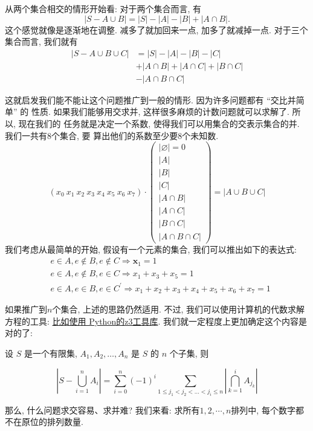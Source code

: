 从两个集合相交的情形开始看: 对于两个集合而言, 有
$$|S-A \cup B|=|S|-|A|-|B|+|A \cap B|. $$
这个感觉就像是逐渐地在调整. 减多了就加回来一点, 加多了就减掉一点. 
对于三个集合而言, 我们就有
$$
\begin{aligned}
|S-A \cup B \cup C| &=|S|-|A|-|B|-|C| \\
&+|A \cap B|+|A \cap C|+|B \cap C| \\
&-|A \cap B \cap C| 
\end{aligned}
$$

这就启发我们能不能让这个问题推广到一般的情形. 因为许多问题都有 “交比并简单” 的
性质. 如果我们能够用交求并, 这样很多麻烦的计数问题就可以求解了. 所以, 现在我们的 
任务就是决定一个系数, 使得我们可以用集合的交表示集合的并. 我们一共有8个集合, 要
算出他们的系数至少要8个未知数. 
$$
(x_0\mathrm{~}x_1\mathrm{~}x_2\mathrm{~}x_3\mathrm{~}x_4\mathrm{~}x_5\mathrm{~}x_6\mathrm{~}x_7)\cdot\left(\begin{array}{c}|\varnothing|=0\\|A|\\|B|\\|C|\\|A\cap B|\\|A\cap C|\\|B\cap C|\\|A\cap B\cap C|\end{array}\right)=|A\cup B\cup C|
$$
我们考虑从最简单的开始, 假设有一个元素的集合, 我们可以推出如下的表达式: 
\begin{align*}
    &e\in A,e\notin B,e\notin C \Rightarrow\boldsymbol{x}_1=1  \\
    &e\in A,e\notin B,e\in C \Rightarrow x_1+x_3+x_5=1  \\
    &e\in A,e\in B,e\in C ^{\prime}\Rightarrow x_1+x_2+x_3+x_4+x_5+x_6+x_7=1 
\end{align*}

如果推广到$n$个集合, 上述的思路仍然适用. 不过, 我们可以使用计算机的代数求解
方程的工具: \href{https://jyywiki.cn/OI/counting.slides#/2/5}{比如使用
Python的z3工具库}. 我们就一定程度上更加确定这个内容是对的了: 

\begin{theorem}[容斥原理]
    设  $S$  是一个有限集,  $A_{1}, A_{2}, \ldots, A_{n}$  是  $S$  的  $n$  个子集, 则

$$\left|S-\bigcup_{i=1}^{n} A_{i}\right|=\sum_{i=0}^{n}(-1)^{i} \sum_{1 \leq j_{1}<j_{2}<\ldots<j_{i} \leq n}\left|\bigcap_{k=1}^{i} A_{j_{k}}\right| $$
    
\end{theorem}
那么, 什么问题求交容易、求并难? 我们来看: 求所有$1,2,\cdots ,n$排列中, 每个数字都不在原位的排列数量.

